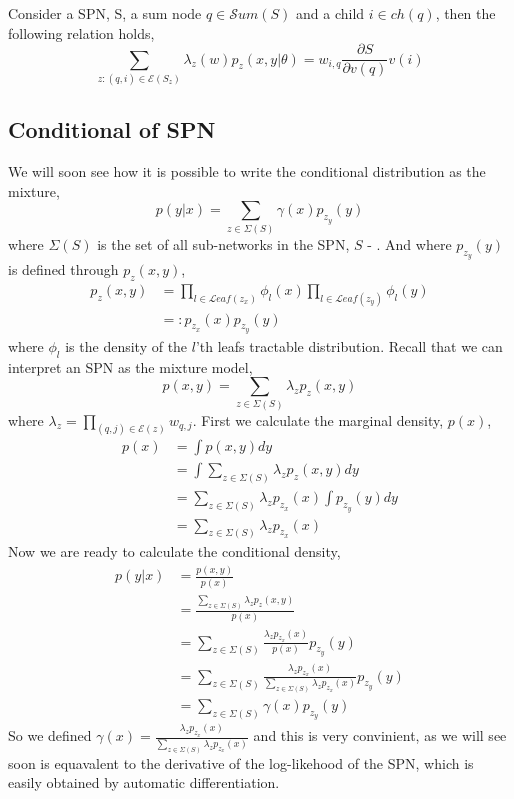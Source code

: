 \begin{proposition}
    Consider a SPN, S, a sum node $q \in \mathcal{S}um(S)$ and a child $i \in ch(q)$,
    then the following relation holds, 
    $$\sum_{z:(q,i)\in \mathcal{E}(S_z)} \lambda_z(w) p_z(x,y|\theta) = w_{i,q}
    \frac{\partial S}{\partial v(q)} v(i)$$
\end{proposition}



\subsection*{Conditional of SPN}

We will soon see how it is possible to write the conditional distribution as the mixture, 
$$p(y|x) = \sum_{z \in \Sigma(S)} \gamma(x) p_{z_y}(y)$$
where $ \Sigma(S)$ is the set of all sub-networks in the SPN, $S$ - .  
And where $p_{z_y}(y)$ is defined through $p_z(x,y)$, 
\begin{align*}
    p_z(x,y) &= \prod_{l \in \mathcal{L}eaf(z_x)} \phi_l(x)\prod_{l \in \mathcal{L}eaf(z_y)} \phi_l(y)\\
            &=: p_{z_x}(x) p_{z_y}(y) 
\end{align*}
where $\phi_l$ is the density of the $l$'th leafs tractable distribution. Recall that we can interpret an SPN
as the mixture model, 
$$p(x,y) = \sum_{z \in \Sigma(S)} \lambda_z p_z(x,y)$$
where $\lambda_z = \prod_{(q,j) \in \mathcal{E}(z)} w_{q,j}$. First we calculate the marginal density,
$p(x)$, 
\begin{align*}
    p(x) &= \int p(x,y)dy\\
    &= \int \sum_{z \in \Sigma(S)} \lambda_z p_z(x,y)dy\\
    &= \sum_{z \in \Sigma(S)} \lambda_z p_{z_x}(x)\int p_{z_y}(y)dy \\
    &= \sum_{z \in \Sigma(S)} \lambda_z p_{z_x}(x)
\end{align*}
Now we are ready to calculate the conditional density, 
\begin{align*}
    p(y|x) &=  \frac{p(x,y)}{p(x)}\\
            &= \frac{\sum_{z \in \Sigma(S)} \lambda_z p_z(x,y)}{p(x)}\\
            &=\sum_{z \in \Sigma(S)}\frac{ \lambda_z p_{z_x}(x)}{p(x)} p_{z_y}(y)\\
            &=\sum_{z \in \Sigma(S)}\frac{ \lambda_z p_{z_x}(x)}{\sum_{z \in \Sigma(S)} \lambda_z p_{z_x}(x)} p_{z_y}(y)\\
            &=\sum_{z \in \Sigma(S)} \gamma(x) p_{z_y}(y)
\end{align*}
So we defined $\gamma(x) = \frac{ \lambda_z p_{z_x}(x)}{\sum_{z \in \Sigma(S)} \lambda_z p_{z_x}(x)}$ 
and this is very convinient, as we will see soon is 
equavalent to the derivative of the log-likehood
of the SPN, which is easily obtained by automatic differentiation. 

